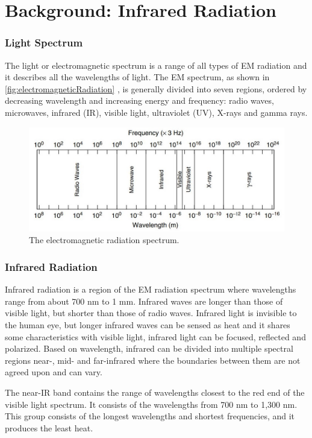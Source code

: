 \section{Background: Infrared Radiation}
\subsubsection{Light Spectrum}
The light or electromagnetic spectrum is a range of all types of EM radiation and it describes all the wavelengths of light. 
The EM spectrum, as shown in \autoref{fig:electromagneticRadiation} \parencite{electromagnetic}, is generally divided into seven regions, ordered by decreasing wavelength and increasing energy and frequency: radio waves, microwaves, infrared (IR), visible light, ultraviolet (UV), X-rays and gamma rays. 


\begin{figure}[H]
\centering
\includegraphics[scale=0.5]{figures/electromagneticRadiation.JPG}
\caption{The electromagnetic radiation spectrum.}\label{fig:electromagneticRadiation}
\end{figure}



\subsubsection{Infrared Radiation}
Infrared radiation is a region of the EM radiation spectrum where wavelengths range from about 700 nm to 1 mm. Infrared waves are longer than those of visible light, but shorter than those of radio waves. 
Infrared light is invisible to the human eye, but longer infrared waves can be sensed as heat and it shares some characteristics with visible light, infrared light can be focused, reflected and polarized.
Based on wavelength, infrared can be divided into multiple spectral regions near-, mid- and far-infrared where the boundaries between them are not agreed upon and can vary.
 

The near-IR band contains the range of wavelengths closest to the red end of the visible light spectrum. It consists of the wavelengths from 700 nm to 1,300 nm. This group consists of the longest wavelengths and shortest frequencies, and it produces the least heat.

